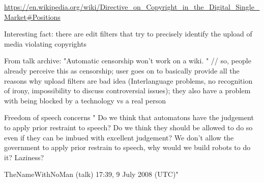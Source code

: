 \url{https://en.wikipedia.org/wiki/Directive_on_Copyright_in_the_Digital_Single_Market#Positions}

Interesting fact: there are edit filters that try to precisely identify the upload of media violating copyrights


From talk archive:
"Automatic censorship won't work on a wiki. " // so, people already perceive this as censorship; user goes on to basically provide all the reasons why upload filters are bad idea (Interlanguage problems, no recognition of irony, impossibility to discuss controversial issues); they also have a problem with being blocked by a technology vs a real person

Freedom of speech concerns
" Do we think that automatons have the judgement to apply prior restraint to speech? Do we think they should be allowed to do so even if they can be imbued with excellent judgement? We don't allow the government to apply prior restrain to speech, why would we build robots to do it? Laziness?

TheNameWithNoMan (talk) 17:39, 9 July 2008 (UTC)"

